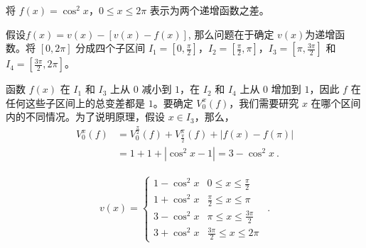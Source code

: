 \begin{example}{将 $f(x)=\cos^{2}x$，$0\leq x\leq2\pi$ 表示为两个递增函数之差。}

假设$f(x) = v(x) - [v(x)-f(x)]$, 那么问题在于确定 $v(x)$为递增函数。将 $[0,2\pi]$ 分成四个子区间 $I_{1}=[0,\frac{\pi}{2}]$，$I_{2}=[\frac{\pi}{2},\pi]$，$I_{3}=[\pi,\frac{3\pi}{2}]$ 和 $I_{4}=[\frac{3\pi}{2},2\pi]$。

函数 $f(x)$ 在 $I_{1}$ 和 $I_{3}$ 上从 $0$ 减小到 $1$，在 $I_{2}$ 和 $I_{4}$ 上从 $0$ 增加到 $1$，因此 $f$ 在任何这些子区间上的总变差都是 $1$。要确定 $V_{0}^{x}(f)$，我们需要研究 $x$ 在哪个区间内的不同情况。为了说明原理，假设 $x\in I_{3}$，那么，
\begin{align}
V_{0}^{x}(f)&=V_{0}^{\frac{\pi}{2}}(f)+V_{\frac{\pi}{2}}^{\pi}(f)+|f(x)-f(\pi)| \\ &=1+1+|\cos^{2}x-1|=3-\cos^{2}x ~.
\end{align}


\begin{align}
 v(x)=\left\{\begin{array}{ll}1-\cos^2x&0\leq x\leq\frac{\pi}{2}\\ 1+\cos^2x&\frac{\pi}{2}\leq x\leq\pi\\ 3-\cos^2x&\pi\leq x\leq\frac{3\pi}{2}\\ 3+\cos^2x&\frac{3\pi}{2}\leq x\leq2\pi\end{array}\right. \ ~. 
\end{align}


\end{example}